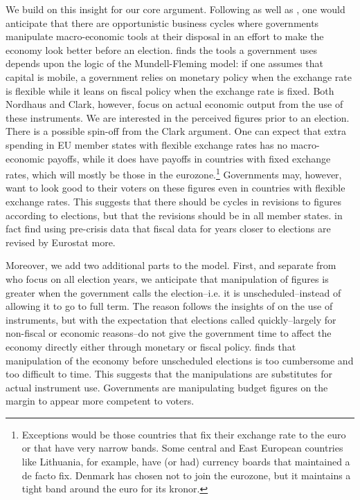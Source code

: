 \documentclass[]{article}
\begin{document}
We build on this insight for our core argument. Following \cite{nordhaus1975} as well as \cite{Alt2014}, one would anticipate that there are opportunistic business cycles where governments manipulate macro-economic tools at their disposal in an effort to make the economy look better before an election. \cite{clark2003} finds the tools a government uses depends upon the logic of the Mundell-Fleming model: if one assumes that capital is mobile, a government relies on monetary policy when the exchange rate is flexible while it leans on fiscal policy when the exchange rate is fixed. Both Nordhaus and Clark, however, focus on actual economic output from the use of these instruments. We are interested in the perceived figures prior to an election. There is a possible spin-off from the Clark argument. One can expect that extra spending in EU member states with flexible exchange rates has no macro-economic payoffs, while it does have payoffs in countries with fixed exchange rates, which will mostly be those in the eurozone.\footnote{Exceptions would be those countries that fix their exchange rate to the euro or that have very narrow bands. Some central and East European countries like Lithuania, for example, have (or had) currency boards that maintained a de facto fix. Denmark has chosen not to join the eurozone, but it maintains a tight band around the euro for its kronor.} Governments may, however, want to look good to their voters on these figures even in countries with flexible exchange rates. This suggests that there should be cycles in revisions to figures according to elections, but that the revisions should be in all member states. \cite{DeCastro2013} in fact find using pre-crisis data that fiscal data for years closer to elections are revised by Eurostat more.

Moreover, we add two additional parts to the model. First, and separate from \cite{Alt2014} who focus on all election years, we anticipate that manipulation of figures is greater when the government calls the election--i.e. it is unscheduled--instead of allowing it to go to full term. The reason follows the insights of \cite{clark2003} on the use of instruments, but with the expectation that elections called quickly--largely for non-fiscal or economic reasons--do not give the government time to affect the economy directly either through monetary or fiscal policy. \cite{Kayser2005} finds that manipulation of the economy before unscheduled elections is too cumbersome and too difficult to time. This suggests that the manipulations are substitutes for actual instrument use. Governments are manipulating budget figures on the margin to appear more competent to voters.
\end{document}
